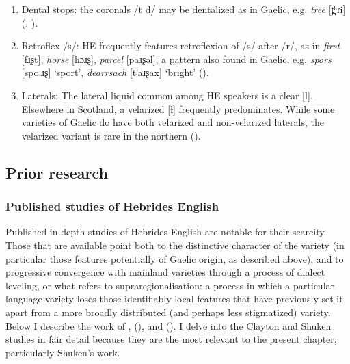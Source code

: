 \documentclass[output=paper,colorlinks,citecolor=brown]{langscibook}
\begin{document}
\begin{enumerate}
\item Dental stops: the coronals /t d/ may be dentalized as in Gaelic, e.g. \textit{tree} [t̪ʰɾi] (\citealt{Grant:1913, Holmer:1957, Dorian:1978, Holmer:1981, Shuken:1984}, \citealt{Ladefoged:1998}).

\item Retroflex /s/: HE frequently features retroflexion of /s/ after /r/, as in \textit{first} [fɹ̩ʂt], \textit{horse} [hɔɹ̩ʂ], \textit{parcel} [paɹ̩ʂəl], a pattern also found in Gaelic, e.g. \textit{spors} [spoːɹʂ] ‘sport’, \textit{dearrsach} [tʲaɹʂax] ‘bright’ (\citealt{Borgstrom:1940, Wells:1982, Shuken:1984, Stuart-Smith:2008}). 

\item Laterals: The lateral liquid common among HE speakers is a clear [l]. Elsewhere in Scotland, a velarized [ɫ] frequently predominates. While some varieties of Gaelic do have both velarized and non-velarized laterals, the velarized variant is rare in the northern  (\cite{Holmer:1957, Holmer:1981, Ternes:1973, Dorian:1978, Wells:1982, Shuken:1984, Shuken:1985, O-Murchu:1989, Johnston:1997, Ladefoged:1998, Stuart-Smith:1999a, Nance:2014}). 
\end{enumerate}

\subsection{Prior research} 

\subsubsection{Published studies of Hebrides English}

Published in-depth studies of Hebrides English are notable for their scarcity. Those that are available point both to the distinctive character of the variety (in particular those features potentially of Gaelic origin, as described above), and to progressive convergence with mainland varieties through a process of dialect leveling, or what \citet{Hickey:2013} refers to supraregionalisation: a process in which a particular language variety loses those identifiably local features that have previously set it apart from a more broadly distributed (and perhaps less stigmatized) variety. Below I describe the work of \citet{Sabban:1985}, \citeauthor{Shuken:1984} (\citeyear{Shuken:1984, Shuken:1985, Shuken:1986}), and \citeauthor{Clayton:2015} (\citeyear{Clayton:2015, Clayton:2017, Clayton:2018}). I delve into the Clayton and Shuken studies in fair detail because they are the most relevant to the present chapter, particularly Shuken’s work. 
\end{document}
